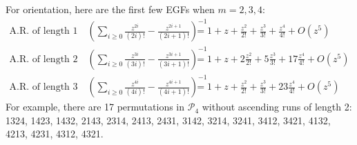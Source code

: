 For orientation, here are the first few EGFs when $m = 2,3,4$:
\begin{equation*}
    \begin{aligned}
        \text{A.R. of length 1} \quad \left(\sum_{i \geq 0} \frac{z^{2i}}{(2i)!} - \frac{z^{2i + 1}}{(2i + 1)!}\right)^{-1}
            &= 1 + z + \frac{z^{2}}{2!} + \frac{z^{3}}{3!} + \frac{z^{4}}{4!} + O(z^{5}) \\
        \text{A.R. of length 2} \quad \left(\sum_{i \geq 0} \frac{z^{3i}}{(3i)!} - \frac{z^{3i + 1}}{(3i + 1)!}\right)^{-1}
            &= 1 + z + 2 \frac{z^{2}}{2!} + 5 \frac{z^{3}}{3!} + 17 \frac{z^{4}}{4!} + O(z^{5}) \\
        \text{A.R. of length 3} \quad \left(\sum_{i \geq 0} \frac{z^{4i}}{(4i)!} - \frac{z^{4i + 1}}{(4i + 1)!}\right)^{-1}
            &= 1 + z + \frac{z^{2}}{2!} + \frac{z^{3}}{3!} + 23 \frac{z^{4}}{4!} + O(z^{5})
    \end{aligned}
\end{equation*}
For example, there are 17 permutations in $\mathcal{P}_4$ without ascending runs of length 2:
1324, 1423, 1432, 2143, 2314,
2413, 2431, 3142, 3214, 3241, 3412, 3421, 4132, 4213, 4231, 4312, 4321.



